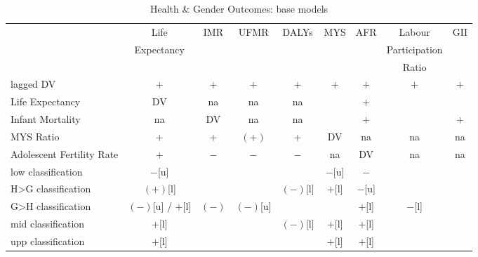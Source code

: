 \begin{landscape}
\begin{table}[!htbp]
\centering
\caption{Health \& Gender Outcomes: base models}
\label{table_hg_base}
\begin{tabular}{lcccccccc}
\toprule
                          & Life              & IMR   & UFMR     & DALYs    & MYS    & AFR    & Labour        & GII \\
                          & Expectancy        &       &          &          &        &        & Participation & \\
                          &                   &       &          &          &        &        & Ratio         & \\
\midrule
lagged DV                 & $+$               & $+$   & $+$      & $+$      & $+$    & $+$    & $+$           & $+$ \\
Life Expectancy           & DV                & na    & na       & na       &        & $+$    &               & \\
Infant Mortality          & na                & DV    & na       & na       &        & $+$    &               & $+$ \\
MYS Ratio                 & $+$               & $+$   & $(+)$    & $+$      & DV     & na     & na            & na \\
Adolescent Fertility Rate & $+$               & $-$   & $-$      & $-$      & na     & DV     & na            & na \\
low classification        & $-$[u]            &       &          &          & $-$[u] & $-$    &               & \\
H>G classification        & $(+)$[l]          &       &          & $(-)$[l] & $+$[l] & $-$[u] &               & \\
G>H classification        & $(-)$[u] / $+$[l] & $(-)$ & $(-)$[u] &          &        & $+$[l] & $-$[l]        & \\
mid classification        & $+$[l]            &       &          & $(-)$[l] & $+$[l] & $+$[l] &               & \\
upp classification        & $+$[l]            &       &          &          & $+$[l] & $+$[l] &               & \\
\bottomrule
\end{tabular}
\end{table}
\end{landscape}
